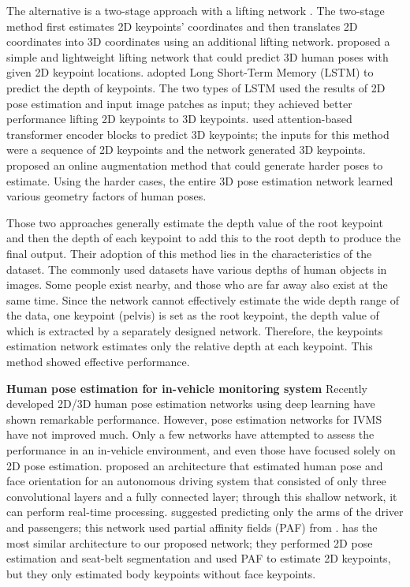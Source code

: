 \documentclass[letterpaper]{article} %
\begin{document}
The alternative is a two-stage approach with a lifting network \cite{martinez2017simple, nie2017monocular, llopart2020liftformer, gong2021poseaug}. The two-stage method first estimates 2D keypoints' coordinates and then translates 2D coordinates into 3D coordinates using an additional lifting network. \cite{martinez2017simple} proposed a simple and lightweight lifting network that could predict 3D human poses with given 2D keypoint locations. \cite{nie2017monocular} adopted Long Short-Term Memory (LSTM) to predict the depth of keypoints. The two types of LSTM used the results of 2D pose estimation and input image patches as input; they achieved better performance lifting 2D keypoints to 3D keypoints. \cite{llopart2020liftformer} used attention-based transformer encoder blocks to predict 3D keypoints; the inputs for this method were a sequence of 2D keypoints and the network generated 3D keypoints. \cite{gong2021poseaug} proposed an online augmentation method that could generate harder poses to estimate. Using the harder cases, the entire 3D pose estimation network learned various geometry factors of human poses.

Those two approaches generally estimate the depth value of the root keypoint and then the depth of each keypoint to add this to the root depth to produce the final output. Their adoption of this method lies in the characteristics of the dataset. The commonly used datasets \cite{ionescu2013human3, mehta2018single} have various depths of human objects in images. Some people exist nearby, and those who are far away also exist at the same time. Since the network cannot effectively estimate the wide depth range of the data, one keypoint (pelvis) is set as the root keypoint, the depth value of which is extracted by a separately designed network. Therefore, the keypoints estimation network estimates only the relative depth at each keypoint. This method showed effective performance.

\textbf{Human pose estimation for in-vehicle monitoring system} Recently developed 2D/3D human pose estimation networks using deep learning have shown remarkable performance. However, pose estimation networks for IVMS have not improved much. Only a few networks \cite{okuno2018body, yuen2018looking, chun2019nads, heo2020lightweight} have attempted to assess the performance in an in-vehicle environment, and even those have focused solely on 2D pose estimation. \cite{okuno2018body} proposed an architecture that estimated human pose and face orientation for an autonomous driving system that consisted of only three convolutional layers and a fully connected layer; through this shallow network, it can perform real-time processing. \cite{yuen2018looking} suggested predicting only the arms of the driver and passengers; this network used partial affinity fields (PAF) from \cite{cao2017realtime}. \cite{chun2019nads} has the most similar architecture to our proposed network; they performed 2D pose estimation and seat-belt segmentation and used PAF to estimate 2D keypoints, but they only estimated body keypoints without face keypoints.
\end{document}
